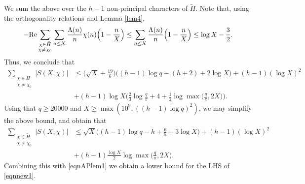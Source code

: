 \documentclass [12pt]{amsart}
\numberwithin{equation}{section}
\newcommand{\tRe}{\textup{Re}}
\begin{document}
We sum the above over the $h-1$ non-principal characters of $\tilde H$.  
Note that, using the orthogonality relations and Lemma \ref{lem4}, 
$$ 
-\tRe \sum_{\substack{ \chi \in \tilde H \\ \chi\neq \chi_0} } \sum_{n\leq X}
\frac{\Lambda(n)}{n} \chi(n) \Big( 1-\frac nX \Big) 
\le  \sum_{n\le X} \frac{\Lambda(n)}{n} \Big(1-\frac nX\Big) \le \log X - \frac 32.  
$$ 
Thus, we conclude that 
 \begin{align*}
 \sum_{\substack{\chi\in \tilde H \\ \chi \neq \chi_0}} |S(X,\chi) | 
&\le \Big(\sqrt{X}+\frac{19}{6}\Big) \Big( (h-1)\log q - (h+2) +2\log X\Big) 
 +(h-1)(\log X)^2 \\
 &+(h-1)\log X  \Big(\frac 23\log \frac q\pi + 4+\frac12 \log \max\Big(\frac q\pi,2X\Big)\Big).
\end{align*}
Using that $q\ge 20000$ and  $X\ge \max(10^9, ((h-1) \log q)^2)$, we  may simplify the above bound, and 
obtain that 
\begin{align} 
\label{eqn4.9} 
\sum_{\substack{\chi\in \tilde H \\ \chi \neq \chi_0}} |S(X,\chi) | 
&\le \sqrt{X} \Big( (h-1)\log q - h +\frac{6}{5} + 3\log X\Big) + (h-1)(\log X)^2 \nonumber\\ 
&+(h-1) \frac{\log X}{2} \log \max \Big( \frac{q}{\pi},2X\Big). 
\end{align}
 Combining this with \eqref{eqnAPlem1} we obtain a lower bound 
 for the LHS of \eqref{eqnnew1}.



\end{document}
